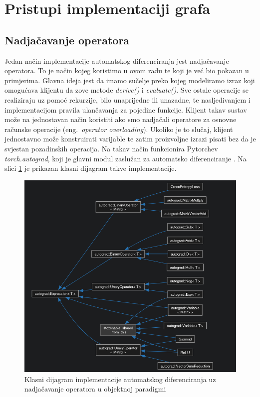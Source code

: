 \documentclass[zavrsnirad]{fer}
\begin{document}
\pagebreak
\section{Pristupi implementaciji grafa}
\subsection{Nadjačavanje operatora}
\label{pog:nadjacavanje}

Jedan način implementacije automatskog diferenciranja jest nadjačavanje operatora. To je način kojeg koristimo u ovom radu te koji je već bio pokazan u primjerima. Glavna ideja jest da imamo sučelje preko kojeg modeliramo izraz koji omogućava klijentu da zove metode \textit{derive()} i \textit{evaluate()}. Sve ostale operacije se realiziraju uz pomoć rekurzije, bilo unaprijedne ili unazadne, te nasljeđivanjem i implementacijom pravila ulančavanja za pojedine funkcije.
Klijent takav sustav može na jednostavan način koristiti ako smo nadjačali operatore za osnovne računske operacije (eng.\ \textit{operator overloading}). Ukoliko je to slučaj, klijent jednostavno može konstruirati varijable te zatim proizvoljne izrazi pisati bez da je svjestan pozadinskih operacija. Na takav način funkcionira Pytorchev \textit{torch.autograd}, koji je glavni modul zaslužan za automatsko diferenciranje \cite{docs:autograd}. Na slici \ref{slk:klasni} je prikazan klasni dijagram takve implementacije.
\\

\begin{figure}[h]
  \centering
  \includegraphics[width=0.7\linewidth]{./slike/klasni_dijagram.png}
  \caption{Klasni dijagram implementacije automatskog diferenciranja uz nadjačavanje operatora u objektnoj paradigmi}
  \label{slk:klasni}
\end{figure}
\end{document}
